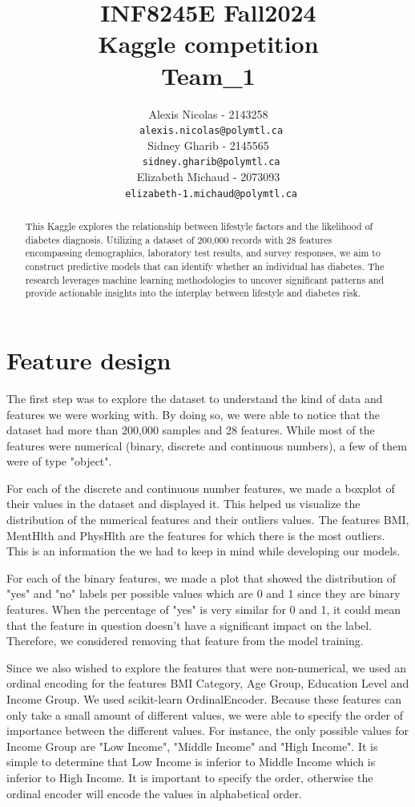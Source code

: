 \documentclass{article} %
\title{INF8245E Fall2024  \\ Kaggle competition \\ Team\_1 }
\author{Alexis Nicolas - 2143258 \\
\texttt{\ alexis.nicolas@polymtl.ca} \\
\And
Sidney Gharib - 2145565 \\
\texttt{\ sidney.gharib@polymtl.ca} \\
\And
Elizabeth Michaud - 2073093 \\
\texttt{\ elizabeth-1.michaud@polymtl.ca} \\
}
\begin{document}
\maketitle

\begin{abstract}
This Kaggle explores the relationship between lifestyle factors and the likelihood of diabetes diagnosis.
Utilizing a dataset of 200,000 records with 28 features encompassing demographics,
laboratory test results, and survey responses, we aim to construct predictive models that can identify whether an individual has diabetes.
The research leverages machine learning methodologies to uncover significant patterns and provide actionable insights into the interplay between lifestyle and diabetes risk.
\end{abstract}

\section{Feature design}

The first step was to explore the dataset to understand the kind of data and features we were working with. By doing so, we were 
able to notice that the dataset had more than 200,000 samples and 28 features. While most of the features were numerical 
(binary, discrete and continuous numbers), a few of them were of type "object". 

For each of the discrete and continuous number features, we made a boxplot of their values in the dataset and displayed it. 
This helped us visualize the distribution of the numerical features and their outliers values. The features BMI, MentHlth and PhysHlth
are the features for which there is the most outliers. This is an information the we had to keep in mind while developing our models.

For each of the binary features, we made a plot that showed the distribution of "yes" and "no" labels per possible values which are 0 and 1 since they are binary features. 
When the percentage of "yes" is very similar for 0 and 1, it could mean that the feature in question doesn't have a significant 
impact on the label. Therefore, we considered removing that feature from the model training. 

Since we also wished to explore the features that were non-numerical, we used an ordinal encoding for the features BMI Category, 
Age Group, Education Level and Income Group. We used scikit-learn OrdinalEncoder. Because these features can only take a small amount of different values, we were able to 
specify the order of importance between the different values. For instance, the only possible values for Income Group are "Low Income", 
"Middle Income" and "High Income". It is simple to determine that Low Income is inferior to Middle Income which is inferior to High 
Income. It is important to specify the order, otherwise the ordinal encoder will encode the values in alphabetical order.
\end{document}

